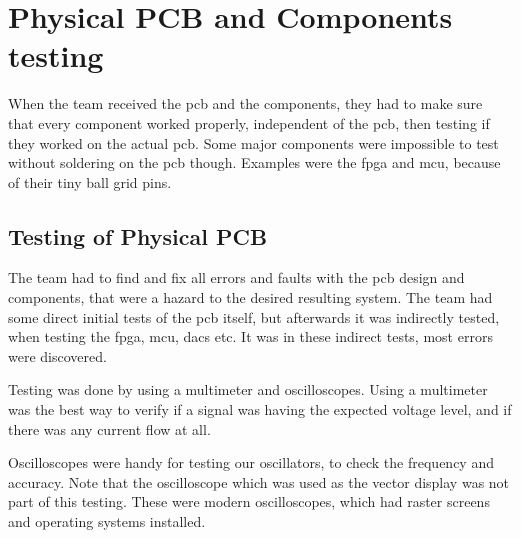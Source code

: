 \section{Physical PCB and Components testing}
When the team received the \gls{pcb} and the components, they had to make sure that every component worked properly, independent of the \gls{pcb}, then testing if they worked on the actual \gls{pcb}. 
Some major components were impossible to test without soldering on the \gls{pcb} though. Examples were the \gls{fpga} and \gls{mcu}, because of their tiny ball grid pins.

\subsection{Testing of Physical PCB}
The team had to find and fix all errors and faults with the \gls{pcb} design and components, that were a hazard to the desired resulting system.  
The team had some direct initial tests of the \gls{pcb} itself, but afterwards it was indirectly tested, when testing the \gls{fpga}, \gls{mcu}, \gls{dac}s etc. It was in these indirect tests, most errors were discovered.

Testing was done by using a multimeter and oscilloscopes. Using a multimeter was the best way to verify if a signal was having the expected voltage level, and if there was any current flow at all.

Oscilloscopes were handy for testing our oscillators, to check the frequency and accuracy. Note that the oscilloscope which was used as the vector display was not part of this testing. These were modern oscilloscopes, which had raster screens and operating systems installed.

